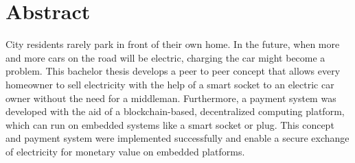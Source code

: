 \thispagestyle{empty}

\section*{Abstract}

City residents rarely park in front of their own home.
In the future, when more and more cars on the road will be electric, charging the car might become a problem.
This bachelor thesis develops a peer to peer concept that allows every homeowner to sell electricity with the help of a smart socket to an electric car owner without the need for a middleman.
Furthermore, a payment system was developed with the aid of a blockchain-based, decentralized computing platform, which can run on embedded systems like a smart socket or plug.
This concept and payment system were implemented successfully and enable a secure exchange of electricity for monetary value on embedded platforms.